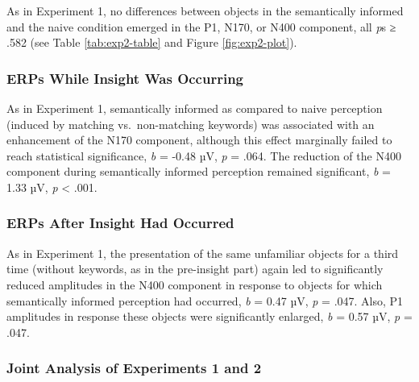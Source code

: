 \documentclass[
  english,
  doc,12pt,twoside,floatsintext]{apa7}
\begin{document}
As in Experiment 1, no differences between objects in the semantically informed and the naive condition emerged in the P1, N170, or N400 component, all \emph{p}s ≥ .582 (see Table \ref{tab:exp2-table} and Figure \ref{fig:exp2-plot}).

\hypertarget{erps-while-insight-was-occurring-1}{%
\subsubsection{ERPs While Insight Was Occurring}\label{erps-while-insight-was-occurring-1}}

As in Experiment 1, semantically informed as compared to naive perception (induced by matching vs.~non-matching keywords) was associated with an enhancement of the N170 component, although this effect marginally failed to reach statistical significance, \emph{b} = -0.48 µV, \emph{p} = .064. The reduction of the N400 component during semantically informed perception remained significant, \emph{b} = 1.33 µV, \emph{p} \textless{} .001.

\hypertarget{erps-after-insight-had-occurred-1}{%
\subsubsection{ERPs After Insight Had Occurred}\label{erps-after-insight-had-occurred-1}}

As in Experiment 1, the presentation of the same unfamiliar objects for a third time (without keywords, as in the pre-insight part) again led to significantly reduced amplitudes in the N400 component in response to objects for which semantically informed perception had occurred, \emph{b} = 0.47 µV, \emph{p} = .047. Also, P1 amplitudes in response these objects were significantly enlarged, \emph{b} = 0.57 µV, \emph{p} = .047.

\hypertarget{joint-analysis-of-experiments-1-and-2}{%
\subsubsection{Joint Analysis of Experiments 1 and 2}\label{joint-analysis-of-experiments-1-and-2}}
\end{document}
